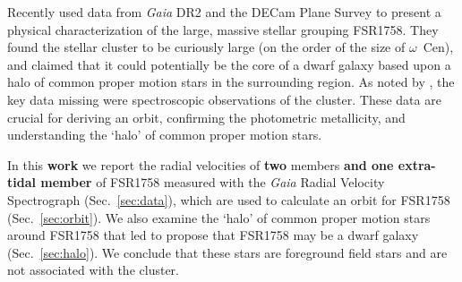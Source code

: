 \documentclass[fleqn,usenatbib]{mnras}
\begin{document}
Recently \citet[][hereafter ]{Barba2018} used data from \textit{Gaia} DR2 and the DECam Plane Survey \citep[DECaPS;][]{Schlafly2018} to present a physical characterization of the large, massive stellar grouping FSR1758. They found the stellar cluster to be curiously large (on the order of the size of $\omega$~Cen), and claimed that it could potentially be the core of a dwarf galaxy based upon a halo of common proper motion stars in the surrounding region. As noted by , the key data missing were spectroscopic observations of the cluster. These data are crucial for deriving an orbit, confirming the photometric metallicity, and understanding the `halo' of common proper motion stars.

In this \textbf{work} we report the radial velocities of \textbf{two} members \textbf{and one extra-tidal member} of FSR1758 measured with the \textit{Gaia} Radial Velocity Spectrograph \citep[RVS;][]{Cropper2018,GaiaCollaboration:2018fx} (Sec.\ \ref{sec:data}), which are used to calculate an orbit for FSR1758 (Sec.\ \ref{sec:orbit}). We also examine the `halo' of common proper motion stars around FSR1758 that led  to propose that FSR1758 may be a dwarf galaxy (Sec.\  \ref{sec:halo}). We conclude that these stars are foreground field stars and are not associated with the cluster.
\end{document}
